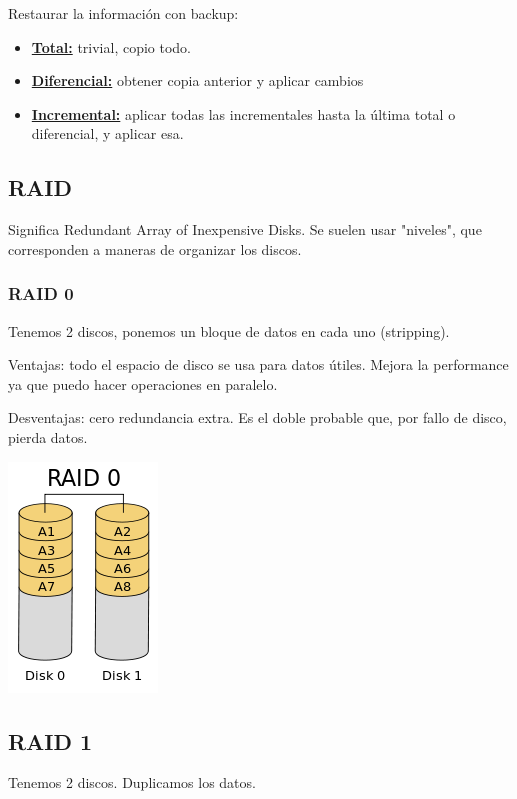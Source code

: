 Restaurar la información con backup:

\begin{itemize}
\item \underline{\textbf{Total:}} trivial, copio todo.
\item \underline{\textbf{Diferencial:}} obtener copia anterior y aplicar cambios
\item \underline{\textbf{Incremental:}} aplicar todas las incrementales hasta la última total o diferencial, y aplicar esa.
\end{itemize}

\subsection{RAID}

Significa Redundant Array of Inexpensive Disks. Se suelen usar "niveles", que corresponden a maneras de organizar los discos.

\subsubsection{RAID 0}

Tenemos 2 discos, ponemos un bloque de datos en cada uno (stripping).

Ventajas: todo el espacio de disco se usa para datos útiles. Mejora la performance ya que puedo hacer operaciones en paralelo.


Desventajas: cero redundancia extra. Es el doble probable que, por fallo de disco, pierda datos.

\includegraphics[scale=1]{imagenes/raid0}


\subsection{RAID 1}

Tenemos 2 discos. Duplicamos los datos.

